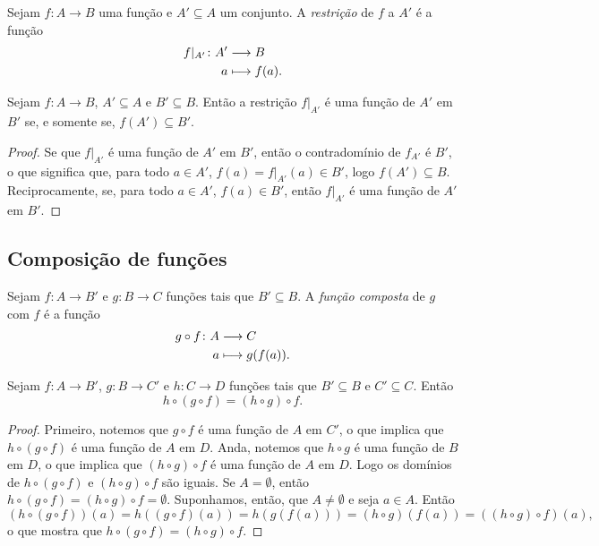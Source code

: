 \begin{definition}
Sejam $f: A \to B$ uma função e $A' \subseteq A$ um conjunto. A \emph{restrição} de $f$ a $A'$ é a função
	\begin{align*}
	{f|_{A'}}\colon {A'} &\longrightarrow {B} \\{a} &\longmapsto f(a).
	\end{align*}
\end{definition}

\begin{proposition}\label{conj:prop.func.rest.ig}
	Sejam $f: A \to B$, $A' \subseteq A$ e $B' \subseteq B$. Então a restrição $f|_{A'}$ é uma função de $A'$ em $B'$ se, e somente se, $f(A') \subseteq B'$.
\end{proposition}
\begin{proof}
	Se que $f|_{A'}$ é uma função de $A'$ em $B'$, então o contradomínio de $f_{A'}$ é $B'$, o que significa que, para todo $a \in A'$, $f(a) = f|_{A'}(a) \in B'$, logo $f(A') \subseteq B$. Reciprocamente, se, para todo $a \in A'$, $f(a) \in B'$, então $f|_{A'}$ é uma função de $A'$ em $B'$.
\end{proof}

\subsection{Composição de funções}

\begin{definition}
	Sejam $f: A \to B'$ e $g: B \to C$ funções tais que $B' \subseteq B$. A \emph{função composta} de $g$ com $f$ é a função
	\begin{align*}
	{g \circ f }\colon {A} &\longrightarrow {C} \\{a} &\longmapsto g(f(a)).
	\end{align*}
\end{definition}

\begin{proposition}
\label{prop:comp.func.asso}
	Sejam $f: A \to B'$, $g: B \to C'$ e $h: C \to D$ funções tais que $B' \subseteq B$ e $C' \subseteq C$. Então
	\begin{equation*}
	h \circ (g \circ f) = (h \circ g) \circ f.
	\end{equation*}
\end{proposition}
\begin{proof}
	Primeiro, notemos que $g \circ f$ é uma função de $A$ em $C'$, o que implica que $h \circ (g \circ f)$ é uma função de $A$ em $D$. Anda, notemos que $h \circ g$ é uma função de $B$ em $D$, o que implica que $(h \circ g) \circ f$ é uma função de $A$ em $D$. Logo os domínios de $h \circ (g \circ f)$ e $(h \circ g) \circ f$ são iguais. Se $A=\emptyset$, então $h \circ (g \circ f) = (h \circ g) \circ f = \emptyset$. Suponhamos, então, que $A \neq \emptyset$ e seja $a \in A$. Então
	\begin{equation*}
	(h \circ (g \circ f))(a) = h((g \circ f)(a)) = h(g(f(a))) = (h \circ g)(f(a)) = ((h \circ g) \circ f)(a),
	\end{equation*}
o que mostra que $h \circ (g \circ f) = (h \circ g) \circ f$. 
\end{proof}

